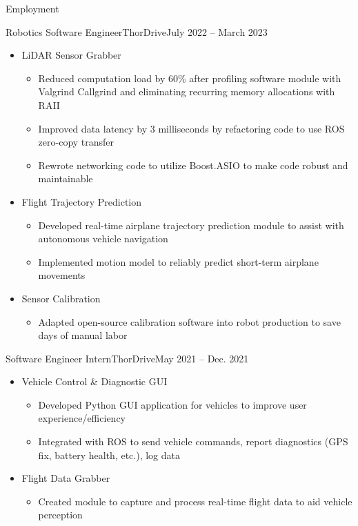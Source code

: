 \documentclass[calibri]{my-resume}
\begin{document}
	\makeheader

	\begin{cvsection}{Employment}
		\begin{cvsubsection}{Robotics Software Engineer}{ThorDrive}{July 2022 -- March 2023}
			\begin{itemize}
				\item LiDAR Sensor Grabber
				\begin{itemize}
					\item Reduced computation load by 60\% after profiling software module with Valgrind Callgrind and eliminating recurring memory allocations with RAII
					\item Improved data latency by 3 milliseconds by refactoring code to use ROS zero-copy transfer
					\item Rewrote networking code to utilize Boost.ASIO to make code robust and maintainable
				\end{itemize}
				\item Flight Trajectory Prediction
				\begin{itemize}
					\item Developed real-time airplane trajectory prediction module to assist with autonomous vehicle navigation
					\item Implemented motion model to reliably predict short-term airplane movements
				\end{itemize}
				\item Sensor Calibration
				\begin{itemize}
					\item Adapted open-source calibration software into robot production to save days of manual labor
				\end{itemize}
			\end{itemize}
		\end{cvsubsection}

		\begin{cvsubsection}{Software Engineer Intern}{ThorDrive}{May 2021 -- Dec. 2021}
			\begin{itemize}
				\item Vehicle Control \& Diagnostic GUI
				\begin{itemize}
					\item Developed Python GUI application for vehicles to improve user experience/efficiency
					\item Integrated with ROS to send vehicle commands, report diagnostics (GPS fix, battery health, etc.), log data
				\end{itemize}
				\item Flight Data Grabber
				\begin{itemize}
					\item Created module to capture and process real-time flight data to aid vehicle perception
				\end{itemize}
			\end{itemize}
		\end{cvsubsection}


\end{cvsection}
\end{document}
